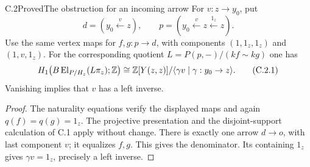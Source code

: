 \begin{claim}{C.2}{Proved}{The obstruction for an incoming arrow}
\label{C:incoming}
For $v:z\to y_0$, put
\[
 d=(y_0\xleftarrow{v}z),\qquad
 p=(y_0\xleftarrow{v}z\xleftarrow{1_z}z).
\]
Use the same vertex maps for $f,g:p\to d$, with components
$(1,1_z,1_z)$ and $(1,v,1_z)$. For the corresponding quotient
$L=P(p,-)/(kf\sim kg)$ one has
\[
 H_1\bigl(B\operatorname{El}_{P/H_z}(L\pi_z);\mathbb Z\bigr)
 \cong \mathbb Z[Y(z,z)]/
 \langle\gamma v\mid\gamma:y_0\to z\rangle.
 \tag{C.2.1}
\]
Vanishing implies that $v$ has a left inverse.
\end{claim}
\begin{proof}
The naturality equations verify the displayed maps and again
$q(f)=q(g)=1_z$. The projective presentation and the disjoint-support
calculation of C.1 apply without change. There is exactly one arrow
$d\to o$, with last component $v$; it equalizes $f,g$.
This gives the denominator. Its containing $1_z$ gives
$\gamma v=1_z$, precisely a left inverse.
\end{proof}

